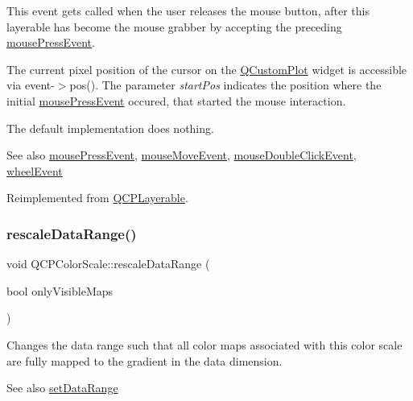 This event gets called when the user releases the mouse button, after this layerable has become the mouse grabber by accepting the preceding \hyperlink{class_q_c_p_color_scale_a91f633b97ffcd57fdf8cd814974c20e6}{mouse\+Press\+Event}.

The current pixel position of the cursor on the \hyperlink{class_q_custom_plot}{Q\+Custom\+Plot} widget is accessible via {\ttfamily event-\/$>$pos()}. The parameter {\itshape start\+Pos} indicates the position where the initial \hyperlink{class_q_c_p_color_scale_a91f633b97ffcd57fdf8cd814974c20e6}{mouse\+Press\+Event} occured, that started the mouse interaction.

The default implementation does nothing.

\begin{DoxySeeAlso}{See also}
\hyperlink{class_q_c_p_color_scale_a91f633b97ffcd57fdf8cd814974c20e6}{mouse\+Press\+Event}, \hyperlink{class_q_c_p_color_scale_a3b2bd79725aefaf2630fc76e90939442}{mouse\+Move\+Event}, \hyperlink{class_q_c_p_layerable_a4171e2e823aca242dd0279f00ed2de81}{mouse\+Double\+Click\+Event}, \hyperlink{class_q_c_p_color_scale_a63cf19be184f6670c9495ad3a9a1baeb}{wheel\+Event} 
\end{DoxySeeAlso}


Reimplemented from \hyperlink{class_q_c_p_layerable_aa0d79b005686f668622bbe66ac03ba2c}{Q\+C\+P\+Layerable}.

\mbox{\label{class_q_c_p_color_scale_a425983db4478543924ddbd04ea20a356}} 
\subsubsection{\texorpdfstring{rescale\+Data\+Range()}{rescaleDataRange()}}
{\footnotesize\ttfamily void Q\+C\+P\+Color\+Scale\+::rescale\+Data\+Range (\begin{DoxyParamCaption}\item[{bool}]{only\+Visible\+Maps }\end{DoxyParamCaption})}

Changes the data range such that all color maps associated with this color scale are fully mapped to the gradient in the data dimension.

\begin{DoxySeeAlso}{See also}
\hyperlink{class_q_c_p_color_scale_abe88633003a26d1e756aa74984587fef}{set\+Data\+Range} 
\end{DoxySeeAlso}
\mbox{\label{class_q_c_p_color_scale_ab9dcc0c1cd583477496209b1413bcb99}} 
